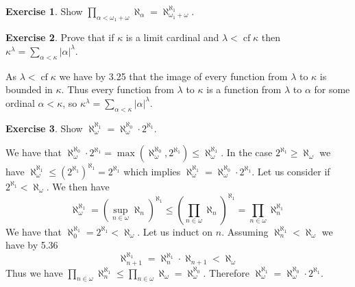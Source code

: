 \documentclass{article}
\theoremstyle{definition}
\newtheorem{exer}{Exercise}[section]
\DeclareMathOperator{\cf}{cf}
\newcommand{\abs}[1]{\lvert#1\rvert}
\newlength{\defparindent}
\newenvironment{answer}
    {\begin{mdframed}[backgroundcolor=gray!15, linewidth=0pt] \setlength{\parindent}{\defparindent}}
    {\end{mdframed}}
\begin{document}
\begin{exer}
    Show $\prod_{\alpha < \omega_1 + \omega} \aleph_\alpha = \aleph_{\omega_1 + \omega}^{\aleph_1}$.
\end{exer}

\begin{exer}
    Prove that if $\kappa$ is a limit cardinal and $\lambda < \cf \kappa$ then $\kappa^\lambda = \sum_{\alpha < \kappa} \abs{\alpha}^\lambda$.
    \begin{answer}
        As $\lambda < \cf \kappa$ we have by 3.25 that the image of every function from $\lambda$ to $\kappa$ is bounded in $\kappa$. Thus every function from $\lambda$ to $\kappa$ is a function from $\lambda$ to $\alpha$ for some ordinal $\alpha < \kappa$, so $\kappa^\lambda = \sum_{\alpha < \kappa} \abs{\alpha}^\lambda$.
    \end{answer}
\end{exer}

\newpage

\begin{exer}
    Show $\aleph_{\omega}^{\aleph_1} = \aleph_{\omega}^{\aleph_0} \cdot 2^{\aleph_1}$.
    \begin{answer}
        We have that $\aleph_{\omega}^{\aleph_0} \cdot 2^{\aleph_1} = \max(\aleph_{\omega}^{\aleph_0}, 2^{\aleph_1}) \le \aleph_{\omega}^{\aleph_1}$. In the case $2^{\aleph_1} \ge \aleph_{\omega}$ we have $\aleph_{\omega}^{\aleph_1} \le (2^{\aleph_1})^{\aleph_1} = 2^{\aleph_1}$ which implies $\aleph_{\omega}^{\aleph_1} = \aleph_{\omega}^{\aleph_0} \cdot 2^{\aleph_1}$. Let us consider if $2^{\aleph_1} < \aleph_{\omega}$. We then have
        \[
            \aleph_{\omega}^{\aleph_1} = 
            (\sup_{n \in \omega} \aleph_n)^{\aleph_1}
            \le
            (\prod_{n \in \omega} \aleph_n)^{\aleph_1}
            = 
            \prod_{n \in \omega} \aleph_{n}^{\aleph_1}
        \]
        We have that $\aleph_{0}^{\aleph_1} = 2^{\aleph_1} < \aleph_{\omega}$. Let us induct on $n$. Assuming $\aleph_{n}^{\aleph_1} < \aleph_{\omega}$ we have by 5.36 
        \[
            \aleph_{n + 1}^{\aleph_1} 
            =
            \aleph_{n}^{\aleph_1} \cdot \aleph_{n + 1}
            < 
            \aleph_{\omega}
        \]
        Thus we have $\prod_{n \in \omega} \aleph_{n}^{\aleph_1} \le \prod_{n \in \omega} \aleph_\omega = \aleph_{\omega}^{\aleph_0}$. Therefore $\aleph_{\omega}^{\aleph_1} = \aleph_{\omega}^{\aleph_0} \cdot 2^{\aleph_1}$.
    \end{answer}
\end{exer}
\end{document}
